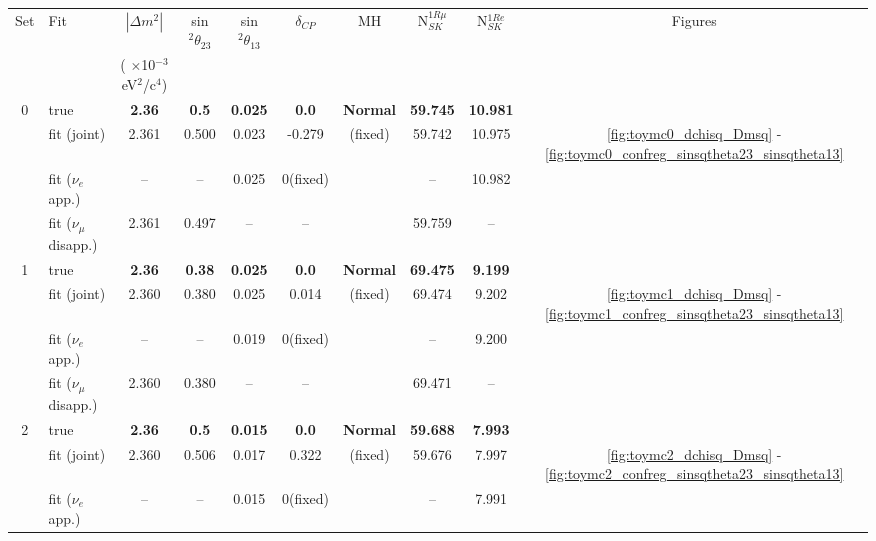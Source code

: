 \begin{table}[htb]
\small
\centering
\begin{tabular}{@{}| c | l | c  c  c  c| c | c  c  | c | |@{}}
\hline
Set & Fit  & $|\Delta m^2|$  & sin$^2\theta_{23}$ & sin$^2\theta_{13}$  & $\delta_{CP}$  &  MH & N$_{SK}^{1R\mu}$ & N$_{SK}^{1Re}$ & Figures  \\
 &   & ( $\times$10$^{-3}$ eV$^{2}$/c$^{4}$) &  &   &  &   &  & &  \\
\hline
0  & true                      & {\bf 2.36 }   & {\bf 0.5}   & {\bf 0.025}   & {\bf 0.0}  & {\bf Normal} & {\bf 59.745}   & {\bf 10.981}   &  \\
   & fit (joint)               & 2.361          & 0.500      & 0.023      & -0.279   & (fixed)    & 59.742     & 10.975   &  \ref{fig:toymc0_dchisq_Dmsq} - \ref{fig:toymc0_confreg_sinsqtheta23_sinsqtheta13} \\
   & fit ($\nu_{e}$ app.)      & --                             & --         & 0.025      & 0(fixed)  &     & --         & 10.982     &  \\
   & fit ($\nu_{\mu}$ disapp.) & 2.361         & 0.497      & --         & --       &   & 59.759      & --       & \\
\hline
1  & true                      & {\bf 2.36 }   & {\bf 0.38}   & {\bf 0.025}   & {\bf 0.0}   & {\bf Normal}  & {\bf 69.475}   & {\bf 9.199}   &  \\
   & fit (joint)               & 2.360         & 0.380      & 0.025      & 0.014    & (fixed)   & 69.474      & 9.202      &  \ref{fig:toymc1_dchisq_Dmsq} - \ref{fig:toymc1_confreg_sinsqtheta23_sinsqtheta13}  \\
   & fit ($\nu_{e}$ app.)      & --                             & --         & 0.019      & 0(fixed)   &     & --         & 9.200       & \\
   & fit ($\nu_{\mu}$ disapp.) & 2.360          & 0.380      & --         & --  &         & 69.471      & --          & \\
\hline
2  & true                      & {\bf 2.36 }   & {\bf 0.5}   & {\bf 0.015}   & {\bf 0.0}   & {\bf Normal}  & {\bf 59.688}   & {\bf 7.993}    & \\
   & fit (joint)               & 2.360          & 0.506      & 0.017      & 0.322   & (fixed)    & 59.676      & 7.997       & \ref{fig:toymc2_dchisq_Dmsq} - \ref{fig:toymc2_confreg_sinsqtheta23_sinsqtheta13} \\
   & fit ($\nu_{e}$ app.)      & --                             & --         & 0.015      & 0(fixed)   &   & --         & 7.991       & \\

\end{tabular}
\end{table}
